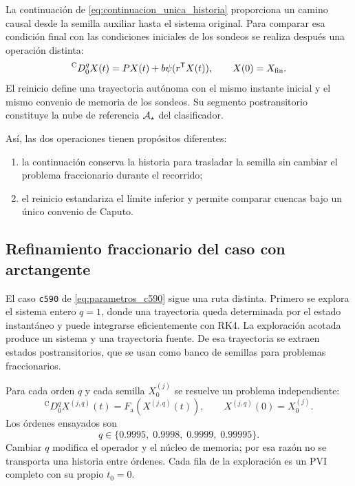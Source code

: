 La continuación de \cref{eq:continuacion_unica_historia} proporciona un camino
causal desde la semilla auxiliar hasta el sistema original. Para
comparar esa condición final con las condiciones iniciales de los sondeos se
realiza después una operación distinta:
\begin{equation}
{}^{\mathrm C}D_{0}^{q}X(t)=PX(t)+b\psi(r^{\mathsf T}X(t)),
\qquad X(0)=X_{\mathrm{fin}}.
\label{eq:reset_objetivo_no_suave}
\end{equation}
El reinicio define una trayectoria autónoma con el mismo instante inicial y
el mismo convenio de memoria de los sondeos. Su segmento postransitorio
constituye la nube de referencia \(\mathcal A_\star\) del clasificador.

Así, las dos operaciones tienen propósitos diferentes:
\begin{enumerate}
 \item la continuación conserva la historia para trasladar la semilla sin
 cambiar el problema fraccionario durante el recorrido;
 \item el reinicio estandariza el límite inferior y permite comparar cuencas
 bajo un único convenio de Caputo.
\end{enumerate}

\subsection{Refinamiento fraccionario del caso con arctangente}
\label{sec:refinamiento_c590}

El caso \texttt{c590} de \cref{eq:parametros_c590} sigue una ruta distinta.
Primero se explora el sistema entero \(q=1\), donde una trayectoria queda
determinada por el estado instantáneo y puede integrarse eficientemente con
RK4. La exploración acotada produce un sistema y una trayectoria fuente. De
esa trayectoria se extraen estados postransitorios, que se usan como banco de
semillas para problemas fraccionarios.

Para cada orden \(q\) y cada semilla \(X_0^{(j)}\) se resuelve un problema
independiente:
\begin{equation}
{}^{\mathrm C}D_{0}^{q}X^{(j,q)}(t)
=F_{\mathrm a}\!\left(X^{(j,q)}(t)\right),
\qquad X^{(j,q)}(0)=X_0^{(j)}.
\label{eq:pvi_refinamiento_c590}
\end{equation}
Los órdenes ensayados son
\begin{equation}
q\in\{0.9995,\;0.9998,\;0.9999,\;0.99995\}.
\label{eq:ordenes_refinamiento}
\end{equation}
Cambiar \(q\) modifica el operador y el núcleo de memoria; por esa razón no se
transporta una historia entre órdenes. Cada fila de la exploración es un PVI
completo con su propio \(t_0=0\).


